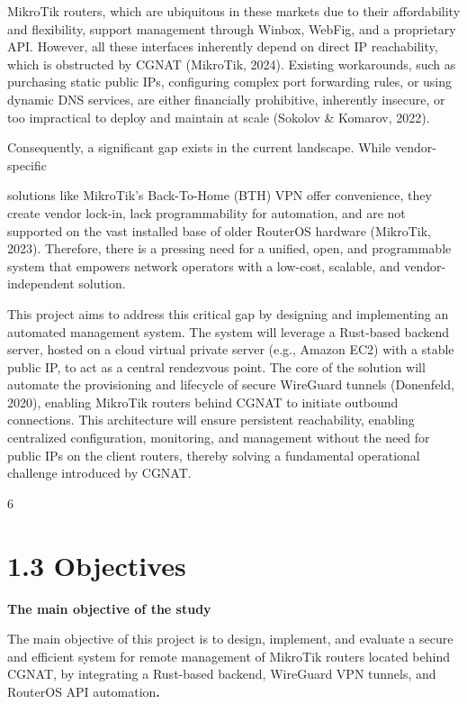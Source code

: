 \documentclass[12pt,a4paper,oneside]{report}
\begin{document}
MikroTik routers, which are ubiquitous in these markets due to their affordability and flexibility, support management through Winbox, WebFig, and a proprietary API. However, all these interfaces inherently depend on direct IP reachability, which is obstructed by CGNAT (MikroTik, 2024). Existing workarounds, such as purchasing static public IPs, configuring complex port forwarding rules, or using dynamic DNS services, are either financially prohibitive, inherently insecure, or too impractical to deploy and maintain at scale (Sokolov \& Komarov, 2022).


Consequently, a significant gap exists in the current landscape. While vendor-specific


solutions like MikroTik's Back-To-Home (BTH) VPN offer convenience, they create vendor lock-in, lack programmability for automation, and are not supported on the vast installed base of older RouterOS hardware (MikroTik, 2023). Therefore, there is a pressing need for a unified, open, and programmable system that empowers network operators with a low-cost, scalable, and vendor-independent solution.




This project aims to address this critical gap by designing and implementing an automated management system. The system will leverage a Rust-based backend server, hosted on a cloud virtual private server (e.g., Amazon EC2) with a stable public IP, to act as a central rendezvous point. The core of the solution will automate the provisioning and lifecycle of secure WireGuard tunnels (Donenfeld, 2020), enabling MikroTik routers behind CGNAT to initiate outbound connections. This architecture will ensure persistent reachability, enabling centralized configuration, monitoring, and management without the need for public IPs on the client routers, thereby solving a fundamental operational challenge introduced by CGNAT.




6


\section{1.3 Objectives}

\textbf{The main objective of the study}


The main objective of this project is to design, implement, and evaluate a secure and efficient system for remote management of MikroTik routers located behind CGNAT, by integrating a Rust-based backend, WireGuard VPN tunnels, and RouterOS API automation\textbf{.}
\end{document}
